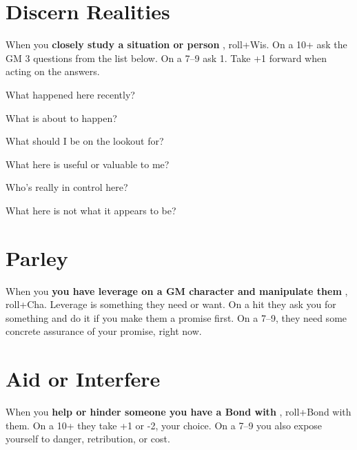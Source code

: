        
\section{Discern Realities}    
       

When you {\bf closely study a situation or person} , roll+Wis. On a 10+ ask the GM 3 questions from the list below. On a 7–9 ask 1. Take +1 forward when acting on the answers.

       
\startitemize[1,packed]
         
\item What happened here recently?

         
\item What is about to happen?

         
\item What should I be on the lookout for?

         
\item What here is useful or valuable to me?

         
\item Who’s really in control here?

         
\item What here is not what it appears to be?

       
\stopitemize
       
\section{Parley}   
       

When you {\bf you have leverage on a GM character and manipulate them} , roll+Cha. Leverage is something they need or want. On a hit they ask you for something and do it if you make them a promise first. On a 7–9, they need some concrete assurance of your promise, right now.

       
\section{Aid or Interfere}    
       

When you {\bf help or hinder someone you have a Bond with} , roll+Bond with them. On a 10+ they take +1 or -2, your choice. On a 7–9 you also expose yourself to danger, retribution, or cost.

          
